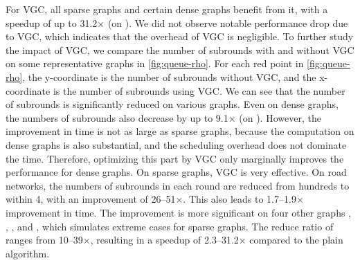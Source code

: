 For VGC, all sparse graphs and certain dense graphs benefit from it, with a speedup of up to 31.2$\times$ (on \GRD{}). 
We did not observe notable performance drop due to VGC, which indicates that the overhead of VGC is negligible. 
To further study the impact of VGC, we compare the number of subrounds with and without VGC on some representative graphs
in \cref{fig:queue-rho}. 
For each red point in \cref{fig:queue-rho}, the y-coordinate is the number of subrounds without VGC, 
and the x-coordinate is the number of subrounds using VGC. 
We can see that the number of subrounds is significantly reduced on various graphs.
Even on dense graphs, the numbers of subrounds also decrease by up to 9.1$\times$ (on \OK{}). 
However, the improvement in time is not as large as sparse graphs, 
because the computation on dense graphs is also substantial, and the scheduling overhead does not dominate the time.
Therefore, optimizing this part by VGC only marginally improves the performance for dense graphs. 
On sparse graphs, VGC is very effective. 
On road networks, the numbers of subrounds in each round are reduced from hundreds to within 4, with an improvement of 26--51$\times$. 
This also leads to 1.7--1.9$\times$ improvement in time. 
The improvement is more significant on four other graphs \TRCE{}, \BBL{}, \GRD{}, and \CBC{}, 
which simulates extreme cases for sparse graphs. 
The reduce ratio of  ranges from 10--39$\times$, 
resulting in a speedup of 2.3--31.2$\times$ compared to the plain algorithm.


% 


% 

